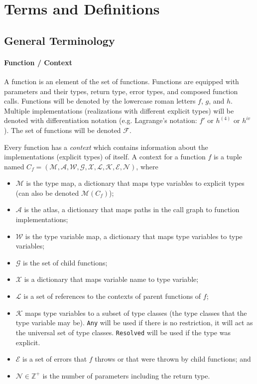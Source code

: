 \documentclass[10pt]{article}
\begin{document}
\pagebreak
\section{Terms and Definitions}

\subsection{General Terminology}
	\paragraph{Function / Context} 
	A function is an element of the set of functions. Functions are equipped
	with parameters and their types, return type, error types, and composed
	function calls.  Functions will be denoted by the lowercase roman letters
	$f$, $g$, and $h$.  Multiple implementations (realizations with different
	explicit types) will be denoted with differentiation notation (e.g.
	Lagrange's notation: $f'$ or $h^{(4)}$ or $h^{iv}$).  The set of functions
	will be denoted $\mathcal{F}$.

	Every function has a \emph{context} which contains information about the
	implementations (explicit types) of itself. A context for a function $f$ is
	a tuple named $C_f = (\mathcal{M}, \mathcal{A}, \mathcal{W}, \mathcal{G},
	\mathcal{X}, \mathcal{L}, \mathcal{K}, \mathcal{E}, \mathcal{N})$, where
	\begin{itemize}[noitemsep]
		\item $\mathcal{M}$ is the type map, a dictionary that maps type
			variables to explicit types (can also be denoted
			$\mathcal{M}(C_f)$);
		\item $\mathcal{A}$ is the atlas, a dictionary that maps paths in the
			call graph to function implementations;
		\item $\mathcal{W}$ is the type variable map, a dictionary that maps
			type variables to type variables;
		\item $\mathcal{G}$ is the set of child functions;
		\item $\mathcal{X}$ is a dictionary that maps variable name to type
			variable;
		\item $\mathcal{L}$ is a set of references to the contexts of parent
			functions of $f$;
		\item $\mathcal{K}$ maps type variables to a subset of type classes
			(the type classes that the type variable may be). \texttt{Any} will
			be used if there is no restriction, it will act as the universal
			set of type classes. \texttt{Resolved} will be used if the type was
			explicit.
		\item $\mathcal{E}$ is a set of errors that $f$ throws or that were
			thrown by child functions; and
		\item $\mathcal{N} \in \mathbb{Z}^+$ is the number of parameters
			including the return type.
	\end{itemize}
\end{document}
